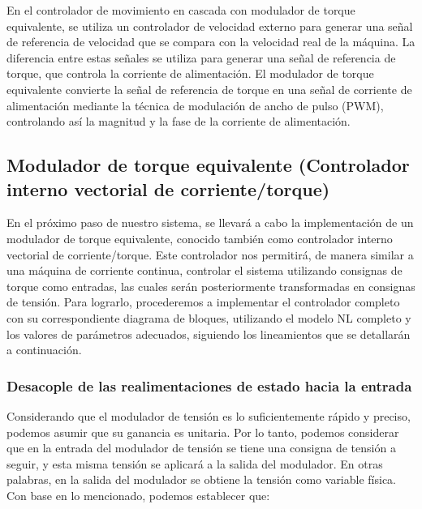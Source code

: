 \documentclass{article}
\begin{document}
En el controlador de movimiento en cascada con modulador de torque equivalente, se utiliza un controlador de 
velocidad externo para generar una señal de referencia de velocidad que se compara con la velocidad real de la 
máquina. La diferencia entre estas señales se utiliza para generar una señal de referencia de torque, que controla 
la corriente de alimentación. El modulador de torque equivalente convierte la señal de referencia de torque en una
señal de corriente de alimentación mediante la técnica de modulación de ancho de pulso (PWM), controlando así la 
magnitud y la fase de la corriente de alimentación.


\subsection{Modulador de torque equivalente (Controlador interno vectorial de corriente/torque)}

En el próximo paso de nuestro sistema, se llevará a cabo la implementación de un modulador de torque equivalente, 
conocido también como controlador interno vectorial de corriente/torque. Este controlador nos permitirá, de manera
similar a una máquina de corriente continua, controlar el sistema utilizando consignas de torque como entradas, 
las cuales serán posteriormente transformadas en consignas de tensión. Para lograrlo, procederemos a implementar 
el controlador completo con su correspondiente diagrama de bloques, utilizando el modelo NL completo y los valores
de parámetros adecuados, siguiendo los lineamientos que se detallarán a continuación.


\subsubsection{Desacople de las realimentaciones de estado hacia la entrada}

Considerando que el modulador de tensión es lo suficientemente rápido y preciso, podemos asumir que su ganancia 
es unitaria. Por lo tanto, podemos considerar que en la entrada del modulador de tensión se tiene una consigna 
de tensión a seguir, y esta misma tensión se aplicará a la salida del modulador. 
En otras palabras, en la salida del modulador se obtiene la tensión como variable física. Con base en lo 
mencionado, podemos establecer que:
\end{document}

